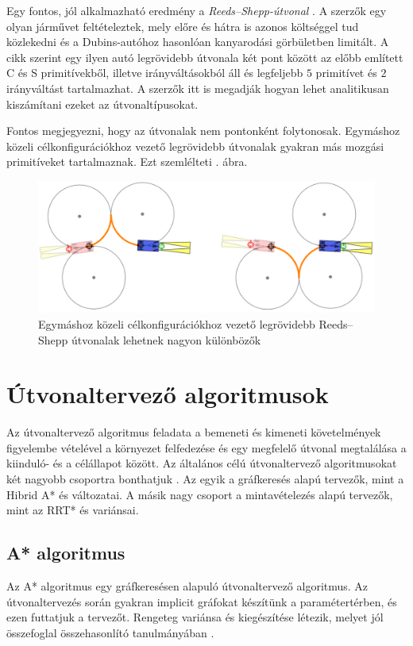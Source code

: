 \documentclass{article}
\begin{document}
Egy fontos, jól alkalmazható eredmény a \textit{Reeds--Shepp-útvonal} \cite{reeds1990optimal}. A szerzők egy olyan járművet feltételeztek, mely előre és hátra is azonos költséggel tud közlekedni és a Dubins-autóhoz hasonlóan kanyarodási görbületben limitált. A cikk szerint egy ilyen autó legrövidebb útvonala két pont között az előbb említett C és S primitívekből, illetve irányváltásokból áll és legfeljebb $5$ primitívet és $2$ irányváltást tartalmazhat. A szerzők itt is megadják hogyan lehet analitikusan kiszámítani ezeket az útvonaltípusokat.

Fontos megjegyezni, hogy az útvonalak nem pontonként folytonosak. Egymáshoz közeli célkonfigurációkhoz vezető legrövidebb útvonalak gyakran más mozgási primitíveket tartalmaznak. Ezt szemlélteti . ábra.

\begin{figure}[ht] 
    \centering
    \includegraphics[width=0.9\linewidth]{images/RS-not-pointwise-cont.png}
    \caption[Reeds--Shepp útvonalak nem pontonként folytonosak]{Egymáshoz közeli célkonfigurációkhoz vezető legrövidebb Reeds--Shepp útvonalak lehetnek nagyon különbözők \cite{BernardiniBeckerRSDemonstration}}
    \label{fig:RS-not-pointwise-cont}
\end{figure}

\section{Útvonaltervező algoritmusok}
Az útvonaltervező algoritmus feladata a bemeneti és kimeneti követelmények figyelembe vételével a környezet felfedezése és egy megfelelő útvonal megtalálása a kiinduló- és a célállapot között. Az általános célú útvonaltervező algoritmusokat két nagyobb csoportra bonthatjuk \cite{gonzalez2015review}. Az egyik a gráfkeresés alapú tervezők, mint a Hibrid A* és változatai. A másik nagy csoport a mintavételezés alapú tervezők, mint az RRT* és variánsai.

\subsection{A* algoritmus}
Az A* algoritmus egy gráfkeresésen alapuló útvonaltervező algoritmus. Az útvonaltervezés során gyakran implicit gráfokat készítünk a paramétertérben, és ezen futtatjuk a tervezőt. Rengeteg variánsa és kiegészítése létezik, melyet \citeauthor{paliwal2023AStarSurvey} jól összefoglal összehasonlító tanulmányában \cite{paliwal2023AStarSurvey}.
\end{document}

